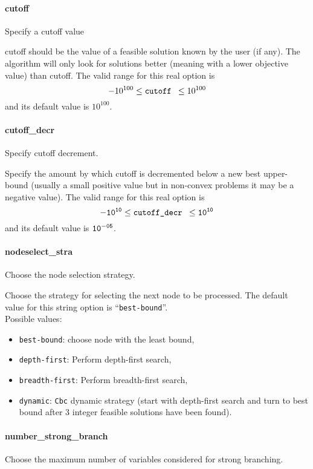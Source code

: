 \paragraph{cutoff}
\label{cutoff}
Specify a cutoff value

cutoff should be the value of a feasible solution known by the user
(if any). The algorithm will only look for solutions better (meaning with a lower objective value)
than cutoff. The valid range for this real option is
$$-10^{100} \le \hbox{\tt cutoff } \le 10^{100}$$
and its default value is $10^{100}$.


\paragraph{cutoff\_decr}
\label{cutoff_decr}
 Specify cutoff decrement.

 Specify the amount by which cutoff is decremented
below a new best upper-bound (usually a small
positive value but in non-convex problems it may
be a negative value). The valid range for this real option is
$${\tt -10^{10}} \le \hbox{\tt cutoff\_decr } \le {\tt 10^{10}}$$
and its default value is ${\tt 10^{-05}}$.


\paragraph{nodeselect\_stra}
\label{nodeselect_stra}
Choose the node selection strategy.

 Choose the strategy for selecting the next node
to be processed.
The default value for this string option is ``{\tt best-bound}''.
\\
Possible values:
\begin{itemize}
   \item {\tt best-bound}: choose node with the least bound,
   \item {\tt depth-first}: Perform depth-first search,
   \item {\tt breadth-first}: Perform breadth-first search,
   \item {\tt dynamic}: {\tt Cbc} dynamic strategy (start with depth-first
search and turn to best bound after 3 integer
feasible solutions have been found).
\end{itemize}


\paragraph{number\_strong\_branch}
\label{number_strong_branch}
Choose the maximum number of variables considered for strong branching.

